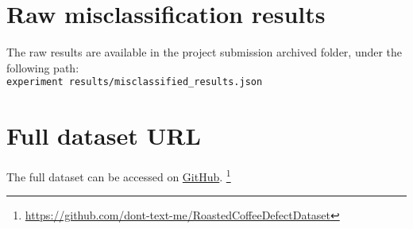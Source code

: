 \section{Raw misclassification results}
\label{sec:raw-misclassification-results}
The raw results are available in the project submission archived folder, under the following path: \\
\verb|experiment results/misclassified_results.json|

\section{Full dataset URL}
\label{sec:full-dataset-url}
The full dataset can be accessed on \href{https://github.com/dont-text-me/RoastedCoffeeDefectDataset}{GitHub}.
\footnote{\url{https://github.com/dont-text-me/RoastedCoffeeDefectDataset}}
